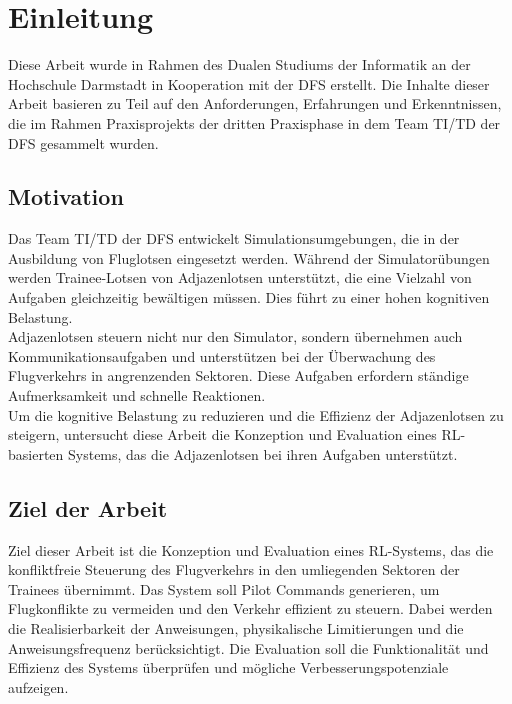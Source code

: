 \chapter{Einleitung}
\label{ch:intro}
Diese Arbeit wurde in Rahmen des Dualen Studiums der Informatik an der Hochschule Darmstadt in Kooperation mit der \ac{DFS} erstellt.
Die Inhalte dieser Arbeit basieren zu Teil auf den Anforderungen, Erfahrungen und Erkenntnissen, die im Rahmen Praxisprojekts der dritten Praxisphase in dem Team 
TI/TD der \ac{DFS} gesammelt wurden.

%
%
\section{Motivation}
\label{sec:intro:motivation}
Das Team TI/TD der \ac{DFS} entwickelt Simulationsumgebungen, die in der Ausbildung von Fluglotsen eingesetzt werden. 
Während der Simulatorübungen werden Trainee-Lotsen von Adjazenlotsen unterstützt, die eine Vielzahl von Aufgaben gleichzeitig bewältigen müssen. 
Dies führt zu einer hohen kognitiven Belastung.
\\

Adjazenlotsen steuern nicht nur den Simulator, sondern übernehmen auch Kommunikationsaufgaben und unterstützen bei der Überwachung des Flugverkehrs in angrenzenden Sektoren. 
Diese Aufgaben erfordern ständige Aufmerksamkeit und schnelle Reaktionen.
\\

Um die kognitive Belastung zu reduzieren und die Effizienz der Adjazenlotsen zu steigern, untersucht diese Arbeit die Konzeption und Evaluation eines \ac{RL}-basierten Systems, 
das die Adjazenlotsen bei ihren Aufgaben unterstützt.
%
%
\section{Ziel der Arbeit}
\label{sec:intro:goal}
Ziel dieser Arbeit ist die Konzeption und Evaluation eines \ac{RL}-Systems, das die konfliktfreie Steuerung des Flugverkehrs in den umliegenden Sektoren der Trainees übernimmt. 
Das System soll Pilot Commands generieren, um Flugkonflikte zu vermeiden und den Verkehr effizient zu steuern. 
Dabei werden die Realisierbarkeit der Anweisungen, physikalische Limitierungen und die Anweisungsfrequenz berücksichtigt. 
Die Evaluation soll die Funktionalität und Effizienz des Systems überprüfen und mögliche Verbesserungspotenziale aufzeigen.

%
%
